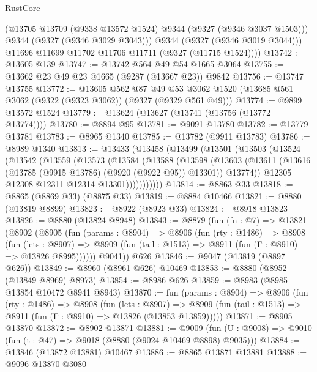\begin{lexlean}{RustCore}
\begin{coremodule}
            (@13705 @13709 (@9338 @13572 @1524) @9344 (@9327 (@9346 @3037 @1503)))
            @9344
            (@9327 (@9346 @3029 @3043)))
          @9344
          (@9327 (@9346 @3019 @3044)))
        @11696
        @11699
        @11702
        @11706
        @11711
        (@9327 (@11715 @1524))))
@13742 := @13605 @139
@13747 := @13742 @564 @49 @54 @1665 @3064
@13755 := @13662 @23 @49 @23 @1665 (@9287 (@13667 @23)) @9842
@13756 := @13747 @13755
@13772 := @13605
    @562
    @87
    @49
    @53
    @3062
    @1520
    (@13685 @561 @3062 (@9322 (@9323 @3062)) (@9327 (@9329 @561 @49)))
@13774 := @9899 @13572 @1524
@13779 := @13624 (@13627 (@13741 (@13756 (@13772 @13774))))
@13780 := @8894 @95
@13781 := @9091 @13780
@13782 := @13779 @13781
@13783 := @8965 @1340
@13785 := @13782 (@9911 @13783)
@13786 := @8989 @1340
@13813 := @13433
    (@13458
      (@13499
        (@13501
          (@13503
            (@13524
              (@13542
                (@13559
                  (@13573
                    (@13584
                      (@13588
                        (@13598
                          (@13603
                            (@13611
                              (@13616 (@13785 (@9915 @13786) (@9920 (@9922 @95)) @13301))
                              @13774))
                          @12305
                          @12308
                          @12311
                          @12314
                          @13301)))))))))))
@13814 := @8863 @33
@13818 := @8865 (@8869 @33) (@8875 @33)
@13819 := @8884 @10466
@13821 := @8880 (@13819 @8899)
@13823 := @8922 (@8923 @33)
@13824 := @8918 @13823
@13826 := @8880 (@13824 @8948)
@13843 := @8879
    (fun (fn : @7) =>
    @13821
      (@8902
        (@8905
          (fun (params : @8904) =>
          @8906
            (fun (rty : @1486) =>
            @8908
              (fun (lets : @8907) =>
              @8909 (fun (tail : @1513) => @8911 (fun (Γ : @8910) => @13826 @8995))))))
        @9041))
    @626
@13846 := @9047 (@13819 (@8897 @626))
@13849 := @8960 (@8961 @626) @10469
@13853 := @8880 (@8952 (@13849 @8969) @8973)
@13854 := @8986 @626
@13859 := @8983 (@8985 @13854 @10472 @8941 @8943)
@13870 := fun (params : @8904) =>
  @8906
    (fun (rty : @1486) =>
    @8908
      (fun (lets : @8907) =>
      @8909 (fun (tail : @1513) => @8911 (fun (Γ : @8910) => @13826 (@13853 @13859)))))
@13871 := @8905 @13870
@13872 := @8902 @13871
@13881 := @9009
    (fun (U : @9008) => @9010 (fun (t : @47) => @9018 (@8880 (@9024 @10469 @8898) @9035)))
@13884 := @13846 (@13872 @13881) @10467
@13886 := @8865 @13871 @13881
@13888 := @9096 @13870 @3080

\end{coremodule}
\end{lexlean}
